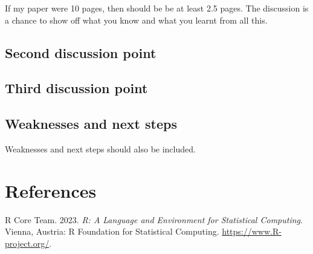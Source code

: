 \documentclass[
  letterpaper,
  DIV=11,
  numbers=noendperiod]{scrartcl}
\newlength{\cslhangindent}
\newlength{\cslentryspacingunit} %
\newenvironment{CSLReferences}[2] %
 {%
  \setlength{\parindent}{0pt}
  \ifodd #1
  \let\oldpar\par
  \def\par{\hangindent=\cslhangindent\oldpar}
  \fi
  \setlength{\parskip}{#2\cslentryspacingunit}
 }%
 {}
\begin{document}
If my paper were 10 pages, then should be be at least 2.5 pages. The
discussion is a chance to show off what you know and what you learnt
from all this.

\hypertarget{second-discussion-point}{%
\subsection{Second discussion point}\label{second-discussion-point}}

\hypertarget{third-discussion-point}{%
\subsection{Third discussion point}\label{third-discussion-point}}

\hypertarget{weaknesses-and-next-steps}{%
\subsection{Weaknesses and next steps}\label{weaknesses-and-next-steps}}

Weaknesses and next steps should also be included.

\newpage

\hypertarget{references}{%
\section*{References}\label{references}}

\hypertarget{refs}{}
\begin{CSLReferences}{1}{0}
\leavevmode{}%
R Core Team. 2023. \emph{R: A Language and Environment for Statistical
Computing}. Vienna, Austria: R Foundation for Statistical Computing.
\url{https://www.R-project.org/}.

\end{CSLReferences}
\end{document}
